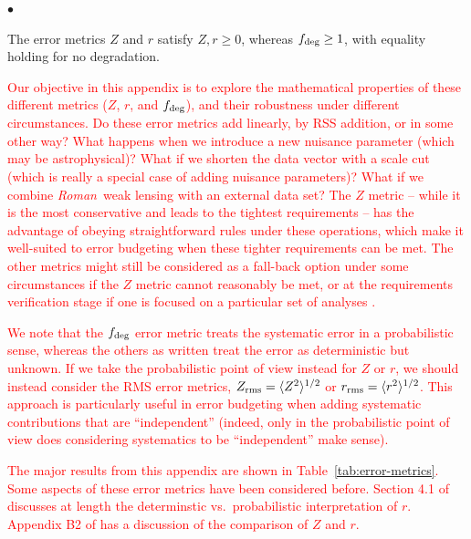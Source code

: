 \documentclass[usenatbib]{mnras}
\newcommand{\wfirst}{{\slshape Roman}}
\newcommand{\changetext}[1]{\textcolor{red}{#1}}
\begin{document}
{\begin{list}{$\bullet$}{}
\end{list}
The error metrics $Z$ and $r$ satisfy $Z,r\ge 0$, whereas $f_{\rm deg}\ge 1$, with equality holding for no degradation.}

\changetext{Our objective in this appendix is to explore the mathematical properties of these different metrics ($Z$, $r$, and $f_{\rm deg}$), and their robustness under different circumstances. Do these error metrics add linearly, by RSS addition, or in some other way? What happens when we introduce a new nuisance parameter (which may be astrophysical)? What if we shorten the data vector with a scale cut (which is really a special case of adding nuisance parameters)? What if we combine \wfirst\ weak lensing with an external data set?
The $Z$ metric -- while it is the most conservative and leads to the tightest requirements -- has the advantage of obeying straightforward rules under these operations, which make it well-suited to error budgeting when these tighter requirements can be met. The other metrics might still be considered as a fall-back option under some circumstances if the $Z$ metric cannot reasonably be met, or at the requirements verification stage if one is focused on a particular set of analyses \citep[e.g.][]{2020A&A...635A.139E}.}

\changetext{We note that the $f_{\rm deg}$ error metric treats the systematic error in a probabilistic sense, whereas the others as written treat the error as deterministic but unknown. If we take the probabilistic point of view instead for $Z$ or $r$, we should instead consider the RMS error metrics, $Z_{\rm rms} = \langle Z^{2}\rangle^{1/2}$ or $r_{\rm rms} = \langle r^2\rangle^{1/2}$. This approach is particularly useful in error budgeting when adding systematic contributions that are ``independent'' (indeed, only in the probabilistic point of view does considering systematics to be ``independent'' make sense).}

\changetext{The major results from this appendix are shown in Table~\ref{tab:error-metrics}. Some aspects of these error metrics have been considered before. Section 4.1 of \citet{2013MNRAS.429..661M} discusses at length the determinstic vs.\ probabilistic interpretation of $r$. Appendix B2 of \citet{2018arXiv180901669T} has a discussion of the comparison of $Z$ and $r$.}
\end{document}

